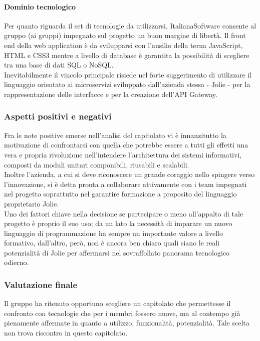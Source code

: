 			\paragraph{Dominio tecnologico}
			Per quanto riguarda il set di tecnologie da utilizzarsi, ItalianaSoftware consente al gruppo (ai gruppi) impegnato sul progetto un buon 
			margine di libertà. Il front end della web application è da svilupparsi con l'ausilio della terna JavaScript, HTML e CSS3 mentre a 
			livello di database è garantita la possibilità di scegliere tra una base di dati SQL o NoSQL.\\
			Inevitabilmente il vincolo principale risiede nel forte suggerimento di utilizzare il linguaggio orientato ai microservizi sviluppato 
			dall'azienda stessa - Jolie - per la rappresentazione delle interfacce e per la creazione dell'API Gateway.
		\subsubsection{Aspetti positivi e negativi}
		Fra le note positive emerse nell'analisi del capitolato vi è innanzitutto la motivazione di confrontarsi con quella che potrebbe essere 
		a tutti gli effetti una vera e propria rivoluzione nell'intendere l'architettura dei sistemi informativi, composti da moduli unitari 
		componibili, riusabili e scalabili.\\
		Inoltre l'azienda, a cui si deve riconoscere un grande coraggio nello spingere verso l'innovazione, si è detta pronta a collaborare attivamente 
		con i team impegnati nel progetto soprattutto nel garantire formazione a proposito del linguaggio proprietario Jolie.\\
		Uno dei fattori chiave nella decisione se partecipare o meno all'appalto di tale progetto è proprio il suo uso; da un lato la necessità di 
		imparare un nuovo linguaggio di programmazione ha sempre un importante valore a livello formativo, dall'altro, però, non è ancora ben chiaro 
		quali siano le reali potenzialità di Jolie per affermarsi nel sovraffollato panorama tecnologico odierno.
		
		\subsubsection{Valutazione finale}
		Il gruppo \hx{} ha ritenuto opportuno scegliere un capitolato che permettesse il confronto con tecnologie che per i membri fossero nuove,
		ma al contempo già pienamente affermate in quanto a utilizzo, funzionalità, potenzialità. Tale scelta non trova riscontro in questo capitolato.
		
